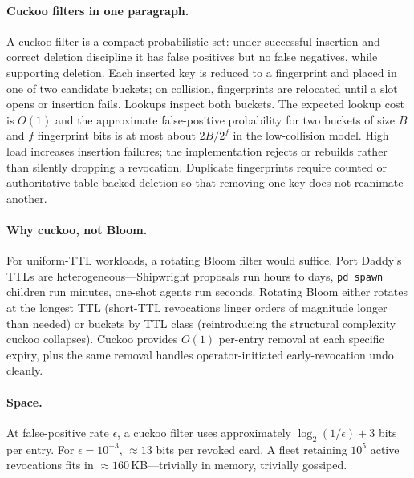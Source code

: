 \documentclass[11pt,a4paper]{article}
\theoremstyle{definition}
\begin{document}
\paragraph{Cuckoo filters in one paragraph.} A cuckoo filter is a compact probabilistic set: under successful insertion and correct deletion discipline it has false positives but no false negatives, while supporting deletion. Each inserted key is reduced to a fingerprint and placed in one of two candidate buckets; on collision, fingerprints are relocated until a slot opens or insertion fails. Lookups inspect both buckets. The expected lookup cost is $O(1)$ and the approximate false-positive probability for two buckets of size $B$ and $f$ fingerprint bits is at most about $2B/2^f$ in the low-collision model. High load increases insertion failures; the implementation rejects or rebuilds rather than silently dropping a revocation. Duplicate fingerprints require counted or authoritative-table-backed deletion so that removing one key does not reanimate another.



\paragraph{Why cuckoo, not Bloom.} For uniform-TTL workloads, a rotating Bloom filter would suffice. Port Daddy's TTLs are heterogeneous---Shipwright proposals run hours to days, \texttt{pd spawn} children run minutes, one-shot agents run seconds. Rotating Bloom either rotates at the longest TTL (short-TTL revocations linger orders of magnitude longer than needed) or buckets by TTL class (reintroducing the structural complexity cuckoo collapses). Cuckoo provides $O(1)$ per-entry removal at each specific expiry, plus the same removal handles operator-initiated early-revocation undo cleanly.

\paragraph{Space.} At false-positive rate $\epsilon$, a cuckoo filter uses approximately $\log_2(1/\epsilon) + 3$ bits per entry. For $\epsilon = 10^{-3}$, $\approx 13$ bits per revoked card. A fleet retaining $10^{5}$ active revocations fits in $\approx 160$\,KB---trivially in memory, trivially gossiped.
\end{document}
